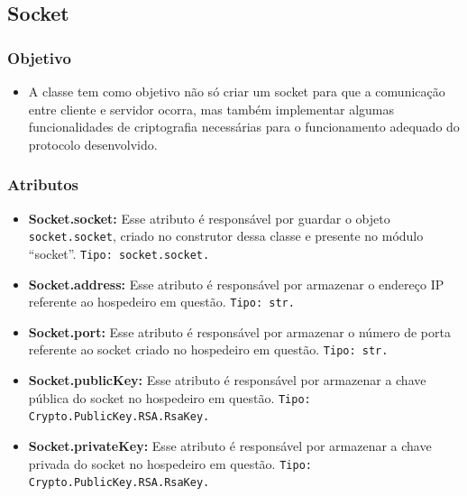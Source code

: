 \documentclass[10pt]{article}
\begin{document}
\begin{itemize}
    \subsection{\Large Socket}
        \subsubsection{\large Objetivo}
            \begin{itemize}
            \item A classe tem como objetivo não só criar um socket para que a comunicação entre cliente e servidor ocorra, mas também implementar algumas funcionalidades de criptografia necessárias para o funcionamento adequado do protocolo desenvolvido.
            \end{itemize}
        \subsubsection{\large Atributos}
            \begin{itemize}
            \item \textbf{Socket.socket:} Esse atributo é responsável por guardar o objeto \texttt{socket.socket}, criado no construtor dessa classe e presente no módulo “socket”. \texttt{Tipo: socket.socket.}
            \item \textbf{Socket.address:}  Esse atributo é responsável por armazenar o endereço IP referente ao hospedeiro em questão. \texttt{Tipo: str.} 
            \item \textbf{Socket.port:} Esse atributo é responsável por armazenar o número de porta referente ao socket criado no hospedeiro em questão. \texttt{Tipo: str.}
            \item \textbf{Socket.publicKey:} Esse atributo é responsável por armazenar a chave pública do socket no hospedeiro em questão. \texttt{Tipo: Crypto.PublicKey.RSA.RsaKey.}
            \item \textbf{Socket.privateKey:} Esse atributo é responsável por armazenar a chave privada do socket no hospedeiro em questão. \texttt{Tipo: Crypto.PublicKey.RSA.RsaKey.}
            \end{itemize}

\end{itemize}
\end{document}
